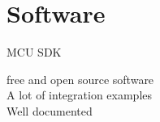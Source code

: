\documentclass[compress,red]{beamer}
\begin{document}

\section{Software}

\begin{frame}{MCU SDK}
  \Large
  \begin{center}
    free and open source software \\
    \vskip 1cm
    A lot of integration examples \\
    \vskip 1cm
    Well documented \\
  \end{center}

\end{frame}
\end{document}
